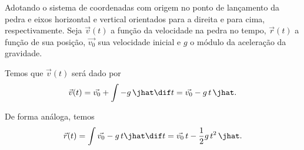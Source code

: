 \documentclass[]{IMTexam}
\begin{document}
\begin{questions}
	\begin{solution}
		Adotando o sistema de coordenadas com origem no ponto de lançamento da pedra e eixos horizontal e vertical orientados para a direita e para cima, respectivamente. Seja $ \vec{v}(t) $ a função da velocidade na pedra no tempo, $ \vec{r}(t) $ a função de sua posição, $ \vec{v_0} $ sua velocidade inicial e $ g $ o módulo da aceleração da gravidade.

		Temos que $ \vec{v}(t) $ será dado por
		\begin{equation}\label{eq:vt}
			\vec{v}(t)=\vec{v_0}+\int -g\,\jhat\dif t=\vec{v_0}-g\,t\,\jhat.
		\end{equation}

		De forma análoga, temos
		\begin{equation}\label{eq:rt}
			\vec{r}(t)=\int\vec{v_0}-g\,t\jhat\dif t=\vec{v_0}\,t-\dfrac{1}{2}g\,t^{2}\,\jhat.
		\end{equation}


\end{solution}
\end{questions}
\end{document}
